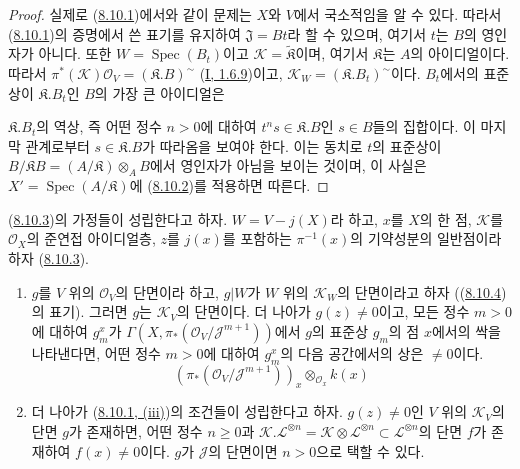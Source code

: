 \begin{proof}
실제로 (\hyperref[II.8.10.1-ko]{8.10.1})에서와 같이 문제는 $X$와
$V$에서 국소적임을 알 수 있다. 따라서
(\hyperref[II.8.10.1-ko]{8.10.1})의 증명에서 쓴 표기를 유지하여
$\mathfrak{J}=Bt$라 할 수 있으며, 여기서 $t$는 $B$의 영인자가 아니다.
또한 $W=\operatorname{Spec}(B_t)$이고
$\mathcal{K}=\widetilde{\mathfrak{K}}$이며, 여기서 $\mathfrak{K}$는
$A$의 아이디얼이다. 따라서
$\pi^*(\mathcal{K})\mathcal{O}_V=(\mathfrak{K}.B)^{\sim}$
(\hyperref[I.1.6.9-ko]{I, 1.6.9})이고,
$\mathcal{K}_W=(\mathfrak{K}.B_t)^{\sim}$이다. $B_t$에서의 표준상이
$\mathfrak{K}.B_t$인 $B$의 가장 큰 아이디얼은

$\mathfrak{K}.B_t$의 역상, 즉 어떤 정수 $n>0$에 대하여
$t^ns\in\mathfrak{K}.B$인 $s\in B$들의 집합이다. 이 마지막 관계로부터
$s\in\mathfrak{K}.B$가 따라옴을 보여야 한다. 이는 동치로 $t$의
표준상이
$B/\mathfrak{K}B=(A/\mathfrak{K})\otimes_A B$에서 영인자가 아님을
보이는 것이며, 이 사실은 $X'=\operatorname{Spec}(A/\mathfrak{K})$에
(\hyperref[II.8.10.2-ko]{8.10.2})를 적용하면 따른다.
\end{proof}

\begin{corollary}[8.10.5]
\label{II.8.10.5-ko}
(\hyperref[II.8.10.3-ko]{8.10.3})의 가정들이 성립한다고 하자.
$W=V-j(X)$라 하고, $x$를 $X$의 한 점, $\mathcal{K}$를
$\mathcal{O}_X$의 준연접 아이디얼층, $z$를 $j(x)$를 포함하는
$\pi^{-1}(x)$의 기약성분의 일반점이라 하자
(\hyperref[II.8.10.3-ko]{8.10.3}).
\begin{enumerate}
  \item[\rm{(i)}] $g$를 $V$ 위의 $\mathcal{O}_V$의 단면이라 하고,
  $g|W$가 $W$ 위의 $\mathcal{K}_W$의 단면이라고 하자
  ((\hyperref[II.8.10.4-ko]{8.10.4})의 표기). 그러면 $g$는
  $\mathcal{K}_V$의 단면이다. 더 나아가 $g(z)\neq0$이고, 모든 정수
  $m>0$에 대하여 $g_m^x$가
  $\Gamma(X,\pi_*(\mathcal{O}_V/\mathcal{J}^{m+1}))$에서 $g$의
  표준상 $g_m$의 점 $x$에서의 싹을 나타낸다면, 어떤 정수 $m>0$에
  대하여 $g_m^x$의 다음 공간에서의 상은 $\neq0$이다.
  \[
    (\pi_*(\mathcal{O}_V/\mathcal{J}^{m+1}))_x
    \otimes_{\mathcal{O}_x}k(x)
  \]
  \item[\rm{(ii)}] 더 나아가
  (\hyperref[II.8.10.1-ko]{8.10.1, (iii)})의 조건들이 성립한다고 하자.
  $g(z)\neq0$인 $V$ 위의 $\mathcal{K}_V$의 단면 $g$가 존재하면,
  어떤 정수 $n\geqslant0$과
  $\mathcal{K}.\mathcal{L}^{\otimes n}=
  \mathcal{K}\otimes\mathcal{L}^{\otimes n}\subset\mathcal{L}^{\otimes n}$의
  단면 $f$가 존재하여 $f(x)\neq0$이다. $g$가 $\mathcal{J}$의
  단면이면 $n>0$으로 택할 수 있다.
\end{enumerate}
\end{corollary}

